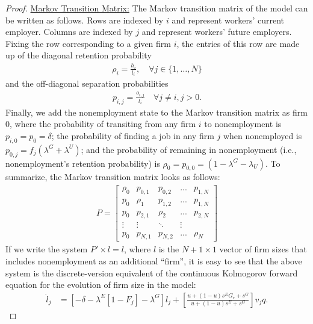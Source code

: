 \begin{proof}
    \underline{Markov Transition Matrix:} %
    The Markov transition matrix of the model can be written as follows. Rows are indexed by $i$ and represent workers' current employer. Columns are indexed by $j$ and represent workers' future employers. Fixing the row corresponding to a given firm $i$, the entries of this row are made up of %
    the diagonal retention probability
    \begin{align}
        \rho_{i} = \frac{h_{i}}{l_{i}}, \quad \forall j \in \{1, \ldots, N\}
    \end{align}
    and %
    the off-diagonal separation probabilities
    \begin{align}
        p_{i,j} = \frac{o_{i,j}}{l_{i}} \quad \forall j \neq i, j > 0.
    \end{align}
    Finally, we add the nonemployment state to the Markov transition matrix as firm $0$, where the probability of transiting from any firm $i$ to nonemployment is $p_{i,0} = p_{0} = \delta$; the probability of finding a job in any firm $j$ when nonemployed is $p_{0,j} = f_j (\lambda^{G} + \lambda^{U})$; and the probability of remaining in nonemployment (i.e., nonemployment's retention probability) is $\rho_{0} = p_{0,0} = (1 - \lambda^{G} - \lambda_U)$. To summarize, the Markov transition matrix looks as follows:
    \begin{align}
         P = %
        \left[
        \begin{matrix} %
	\rho_{0} & p_{0,1} & p_{0,2} & ... & p_{1,N} \\
        p_{0} & \rho_{1} & p_{1,2} & ... & p_{1,N} \\
        p_{0} & p_{2,1} & \rho_{2} & ... & p_{2,N} \\
        \vdots & \vdots & \ddots & \vdots \\
        p_{0} & p_{N,1} & p_{N,2} & ... & \rho_{N} %
        \end{matrix} \right] %
        \label{eq:P_matrix}
    \end{align}
    If we write the system $P' \times l = l$, where $l$ is the $N+1 \times 1$ vector of firm sizes that includes nonemployment as an additional ``firm'', it is easy to see that the above system is the discrete-version equivalent of the continuous Kolmogorov forward equation for the evolution of firm size in the model:
    \begin{align}
    \dot{l}_{j} &= \left[ -\delta - \lambda^{E} \left[1 - F_{j}\right] - \lambda^{G} \right] l_{j} + \left[ \frac{u + (1 - u) s^{E} G_{r} + s^{G}}{u + (1 - u) s^{E} + s^{G}} \right] v_{j} q.

\end{align}
\end{proof}
